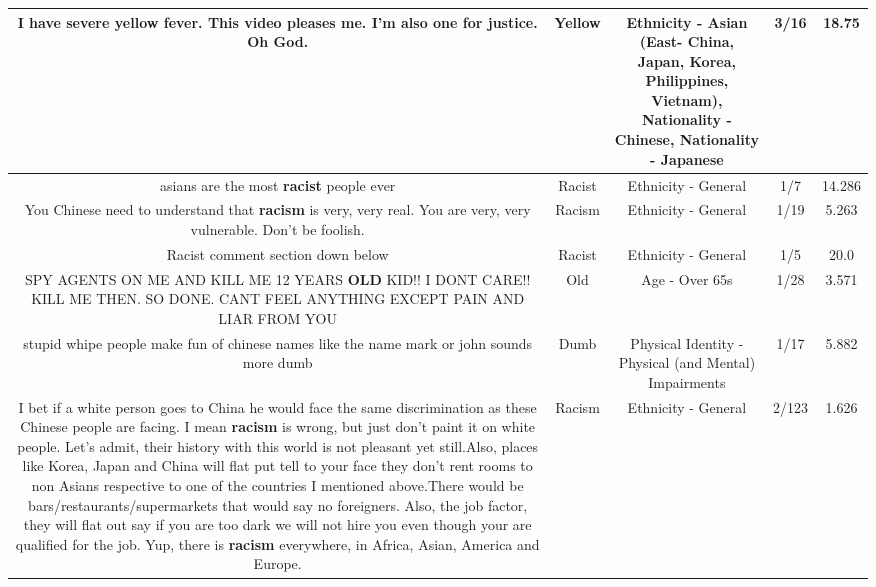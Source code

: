 \documentclass[11pt]{article}
\newlength\mylength
\begin{document}
\begin{center}
\begin{longtable}{|C{.65\mylength}|C{.30\mylength}|C{.12\mylength}|C{.12\mylength}|C{.12\mylength}|}
  \small I have severe \textbf{y\textbf{e\textbf{llow}}} fever. This video pleases me. I'm also one for justice. Oh God.\normalsize   & Yellow & Ethnicity - Asian (East- China, Japan, Korea, Philippines, Vietnam), Nationality - Chinese, Nationality - Japanese & 3/16 & 18.75 \\  \hline
  \small asians are the most \textbf{racist} people ever\normalsize   & Racist & Ethnicity - General & 1/7 & 14.286 \\  \hline
  \small You Chinese need to understand that \textbf{racism} is very, very real. You are very, very vulnerable. Don't be foolish.\normalsize   & Racism & Ethnicity - General & 1/19 & 5.263 \\  \hline
  \small Racist comment section down below\normalsize   & Racist & Ethnicity - General & 1/5 & 20.0 \\  \hline
  \small SPY AGENTS ON ME AND KILL ME 12 YEARS \textbf{OLD} KID!! I DONT CARE!! KILL ME THEN. SO DONE. CANT FEEL ANYTHING EXCEPT PAIN AND LIAR FROM YOU\normalsize   & Old & Age - Over 65s & 1/28 & 3.571 \\  \hline
  \small stupid whipe people make fun of chinese names like the name mark or john sounds more dumb\normalsize   & Dumb & Physical Identity - Physical (and Mental) Impairments & 1/17 & 5.882 \\  \hline
  \small I bet if a white person goes to China he would face the same discrimination as these Chinese people are facing. I mean \textbf{racism} is wrong, but just don't paint it on white people. Let's admit, their history with this world is not pleasant yet still.Also, places like Korea, Japan and China will flat put tell to your face they don't rent rooms to non Asians respective to one of the countries I mentioned above.There would be bars/restaurants/supermarkets that would say no foreigners. Also, the job factor, they will flat out say if you are too dark we will not hire you even though your are qualified for the job. Yup, there is \textbf{racism} everywhere, in Africa, Asian, America and Europe.\normalsize   & Racism & Ethnicity - General & 2/123 & 1.626 \\  \hline

\end{longtable}
\end{center}
\end{document}
